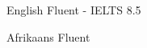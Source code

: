 
\begin{cvskills}
  \cvskill
    {English} %
    {Fluent - IELTS 8.5} %

  \cvskill
    {Afrikaans} %
    {Fluent} %
\end{cvskills}
